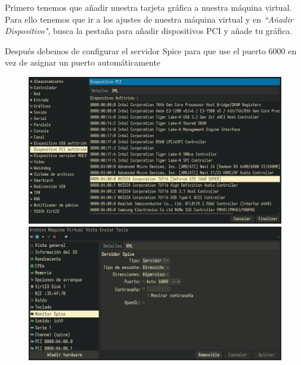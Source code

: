 \documentclass[11pt]{article}
\begin{document}
\vspace{5pt}

Primero tenemos que añadir nuestra tarjeta gráfica a nuestra máquina virtual. Para ello tenemos que ir a los ajustes de nuestra máquina virtual y en \textit{``Añadir Dispositivo"}, busca la pestaña para añadir dispositivos PCI y añade tu gráfica.

\vspace{5pt}

Después debemos de configurar el servidor Spice para que use el puerto 6000 en vez de asignar un puerto automáticamente

\begin{figure}[h!]
	\centering
	\begin{minipage}[b]{0.4965\textwidth}
		\includegraphics[height=0.6\textwidth,width=\textwidth]{images/card-add.jpg}
	\end{minipage}
	\begin{minipage}[b]{0.4965\textwidth}
		\includegraphics[height=0.6\textwidth,width=\textwidth]{images/spice-conf.jpg}
	\end{minipage}
\end{figure}
\end{document}
